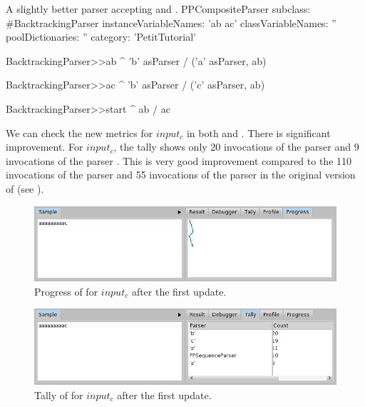 \documentclass[a4paper,10pt,twoside]{book}
\begin{document}
\begin{script}{A slightly better parser accepting  and . \label{scr:pp/backtrackingParser-update-1}}
PPCompositeParser subclass: #BacktrackingParser
	instanceVariableNames: 'ab ac'
	classVariableNames: ''
	poolDictionaries: ''
	category: 'PetitTutorial'

BacktrackingParser>>ab
  ^  'b' asParser / 
     ('a' asParser, ab)

BacktrackingParser>>ac
  ^  'b' asParser / 
     ('c' asParser, ab)

BacktrackingParser>>start
  ^ ab / ac
\end{script}

We can check the new metrics for $input_c$ in both  and . There is significant improvement.
For $input_c$, the tally shows only 20 invocations of the parser  and 9 invocations of the parser .
This is very good improvement compared to the 110 invocations of the parser  and 55 invocations of the parser  in the original version of  (see ).

\begin{figure}
  \begin{center}
    \includegraphics[width=\linewidth]{example-progressAaac-update-1}
    \caption{Progress of  for $input_c$ after the first update. \label{fig:pp/example-progressAaac-update-1}}
  \end{center}
\end{figure}

\begin{figure}
  \begin{center}
    \includegraphics[width=\linewidth]{example-tallyAaac-update-1}
    \caption{Tally of  for $input_c$ after the first update. \label{fig:pp/example-tallyAaac-update-1}}
  \end{center}
\end{figure}
\end{document}
